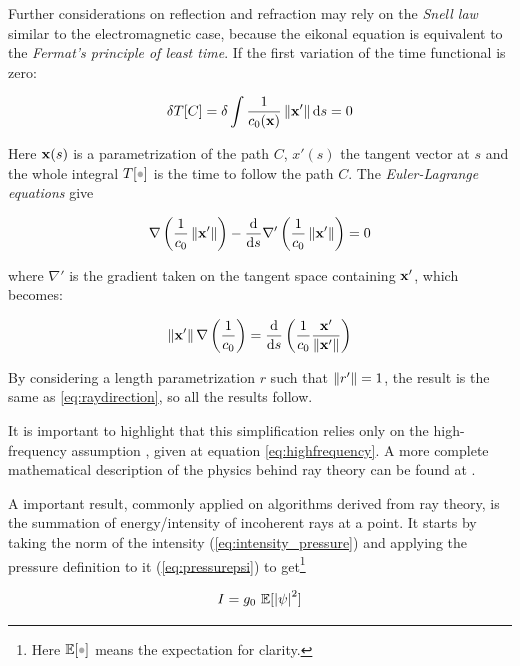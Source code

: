 Further considerations on reflection and refraction may rely on the
\textit{Snell law} similar to the electromagnetic case, because the eikonal
equation is equivalent to the \textit{Fermat's principle of least time}. If
the first variation of the time functional is zero:

\begin{equation*}
\delta T[C] = \delta \int \frac{1}{c_0(\mathrm{\mathbf{x}})}
\left\lVert\mathrm{\mathbf{x}}'\right\rVert \mathrm{d} s = 0
\end{equation*}

Here $\mathrm{\mathbf{x}}(s)$ is a parametrization of the path $C$, $x'(s)$ the tangent
vector at $s$ and the whole integral $T[\parm]$ is the time to follow the path
$C$. The \textit{Euler-Lagrange equations} give


\begin{equation*}
\nabla\left(\frac{1}{c_0}\left\lVert\mathrm{\mathbf{x}}'\right\rVert\right) - \frac{\mathrm{d}}{\mathrm{d} s}
\nabla'\left(\frac{1}{c_0} \left\lVert\mathrm{\mathbf{x}}'\right\rVert\right) = 0
\end{equation*}

where $\nabla'$ is the gradient taken on the tangent space containing
$\mathrm{\mathbf{x}}'$, which becomes:

\begin{equation*}
\left\lVert\mathrm{\mathbf{x}}'\right\rVert\nabla\left(\frac{1}{c_0}\right) =
\frac{\mathrm{d}}{\mathrm{d} s}\left( \frac{1}{c_0}
\frac{\mathrm{\mathbf{x}}'}{\left\lVert\mathrm{\mathbf{x}}'\right\rVert}\right)
\end{equation*}

By considering a length parametrization $r$ such that $\left\lVert r'\right\rVert=1$, the
result is the same as \ref{eq:raydirection}, so all the results follow.

It is important to highlight that this simplification relies only on the
high-frequency assumption \cite{national1969physics}, given at equation
\ref{eq:highfrequency}. A more complete mathematical description of the physics
behind ray theory can be found at \citet{Lefebvre}.

A important result, commonly applied on algorithms derived from ray theory, is
the summation of energy/intensity of incoherent rays at a point. It starts by
taking the norm of the intensity (\ref{eq:intensity_pressure}) and applying the
pressure definition to it (\ref{eq:pressurepsi}) to get\footnote{Here
$\mathbb{E}[\parm]$ means the expectation for clarity.}


\begin{equation}\label{eq:intensity_psi}
I = g_0~\mathbb{E}[\left|\psi\right|^2]
\end{equation}

